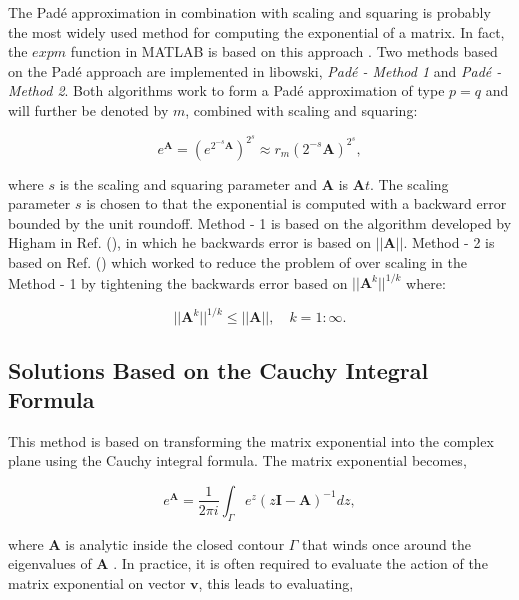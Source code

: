 The Pad\'e approximation in combination with scaling and squaring is probably the most widely used method for computing the exponential of a matrix. In fact, the $expm$ function in MATLAB is based on this approach \cite{higham2009}. Two methods based on the Pad\'e approach are implemented in libowski, \textit{Pad\'e - Method 1} and \textit{Pad\'e - Method 2}. Both algorithms work to form a Pad\'e approximation of type $p = q$ and will further be denoted by $m$, combined with scaling and squaring:

\begin{equation}
    e^{\boldsymbol{A}} = (e^{2^{-s}\boldsymbol{A}})^{2^{s}} \approx r_{m}(2^{-s}\boldsymbol{A})^{2^{s}},
\end{equation}

\noindent where $s$ is the scaling and squaring parameter and $\boldsymbol{A}$ is $\boldsymbol{A}t$. The scaling parameter $s$ is chosen to that the exponential is computed with a backward error bounded by the unit roundoff.  Method - 1 is based on the algorithm developed by Higham in Ref. (\cite{higham2005}), in which he backwards error is based on $||\boldsymbol{A}||$. Method - 2 is based on Ref. (\cite{higham2009}) which worked to reduce the problem of over scaling in the Method - 1 by tightening the backwards error based on $||\boldsymbol{A}^{k}||^{1/k}$ where:

\begin{equation}
    ||\boldsymbol{A}^{k}||^{1/k} \leq ||\boldsymbol{A}||, \quad k = 1:\infty.
\end{equation}


\subsection{Solutions Based on the Cauchy Integral Formula}
This method is based on transforming the matrix exponential into the complex plane using the Cauchy integral formula.  The matrix exponential becomes,

\begin{equation}
	e^{\boldsymbol{A}} = \frac{1}{2\pi i}\int_{\Gamma} e^{z}(z\boldsymbol{I} - \boldsymbol{A})^{-1}dz,
	\label{eq:cauchyExp}
\end{equation}

\noindent where $\boldsymbol{A}$ is analytic inside the closed contour $\Gamma$ that winds once around the eigenvalues of $\boldsymbol{A}$ \cite{pusaThesis} \cite{pusa2011} \cite{Trefethen2006}. In practice, it is often required to evaluate the action of the matrix exponential on vector $\boldsymbol{v}$, this leads to evaluating,

